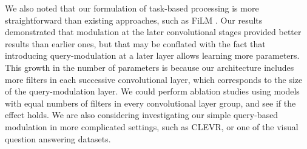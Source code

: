 We also noted that our formulation of task-based processing is more straightforward than existing approaches, such as FiLM 
\parencite{Perez2017,Dumoulin2018}. Our results demonstrated that modulation at the later convolutional stages provided better results than earlier ones, but that may be conflated with the fact that introducing query-modulation at a later layer allows learning more parameters. This growth in the number of parameters is because our architecture includes more filters in each successive convolutional layer, which corresponds to the size of the query-modulation layer. We could perform ablation studies using models with equal numbers of filters in every convolutional layer group, and see if the effect holds. We are also considering investigating our simple query-based modulation in more complicated settings, such as CLEVR, or one of the visual question answering datasets. 
 